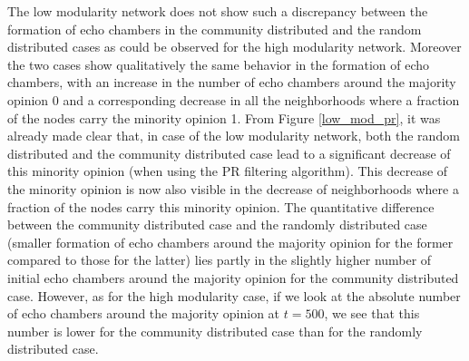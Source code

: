 \documentclass[11 pt , letterpaper , twoside , openright]{book}
\begin{document}
The low modularity network does not show such a discrepancy between the formation of echo chambers in the community distributed and the random distributed cases as could be observed for the high modularity network. Moreover the two cases show qualitatively the same behavior in the formation of echo chambers, with an increase in the number of echo chambers around the majority opinion 0 and a corresponding decrease in all the neighborhoods where a fraction of the nodes carry the minority opinion 1. From Figure \ref{low_mod_pr}, it was already made clear that, in case of the low modularity network, both the random distributed and the community distributed case lead to a significant decrease of this minority opinion (when using the PR filtering algorithm). This decrease of the minority opinion is now also visible in the decrease of neighborhoods where a fraction of the nodes carry this minority opinion. The quantitative difference between the community distributed case and the randomly distributed case (smaller formation of echo chambers around the majority opinion for the former compared to those for the latter) lies partly in the slightly higher number of initial echo chambers around the majority opinion for the community distributed case. However, as for the high modularity case, if we look at the absolute number of echo chambers around the majority opinion at $t=500$, we see that this number is lower for the community distributed case than for the randomly distributed case. %
\end{document}
